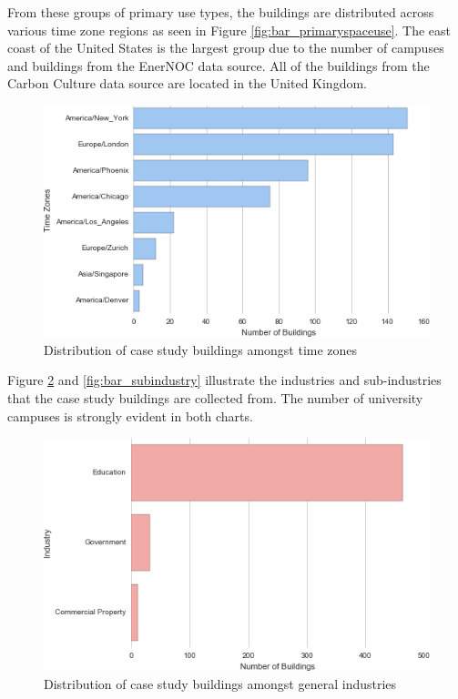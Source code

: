 From these groups of primary use types, the buildings are distributed across various time zone regions as seen in Figure \ref{fig:bar_primaryspaceuse}. The east coast of the United States is the largest group due to the number of campuses and buildings from the EnerNOC data source. All of the buildings from the Carbon Culture data source are located in the United Kingdom.

\begin{figure}[ht!]
\begin{center}
\includegraphics[width=0.98\columnwidth]{figures/timezonesbar1/timezonesbar}
\caption{Distribution of case study buildings amongst time zones
\label{fig:bar_timezone}%
}
\end{center}
\end{figure}

Figure \ref{fig:bar_industry} and \ref{fig:bar_subindustry} illustrate the industries and sub-industries that the case study buildings are collected from. The number of university campuses is strongly evident in both charts.

\begin{figure}[ht!]
\begin{center}
\includegraphics[width=0.98\columnwidth]{figures/bar_industry/bar_industry}
\caption{Distribution of case study buildings amongst general industries
\label{fig:bar_industry}%
}
\end{center}
\end{figure}

